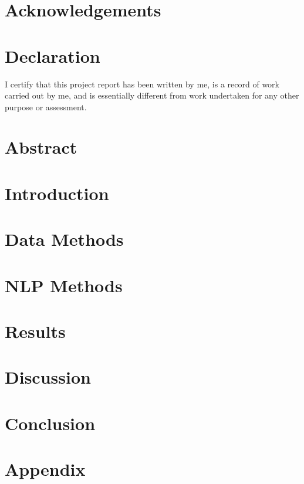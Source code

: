 \documentclass[]{report}
\newcommand\blankpage{%
    \null
    \thispagestyle{empty}%
    \addtocounter{page}{-1}%
    \newpage}
\begin{document}

\tableofcontents
\afterpage{\blankpage}

\chapter*{Acknowledgements}

\chapter*{Declaration}
I certify that this project report has been written by me, is a record of work carried out by me, and is essentially different from work undertaken for any other purpose or assessment.

\chapter*{Abstract}


\chapter{Introduction} %

 
\chapter{Data Methods} %


 
\chapter{NLP Methods} \label{methods}%



 
\chapter{Results} %


 
\chapter{Discussion} %


 
\chapter{Conclusion}





\appendix
\chapter{Appendix}
\end{document}
